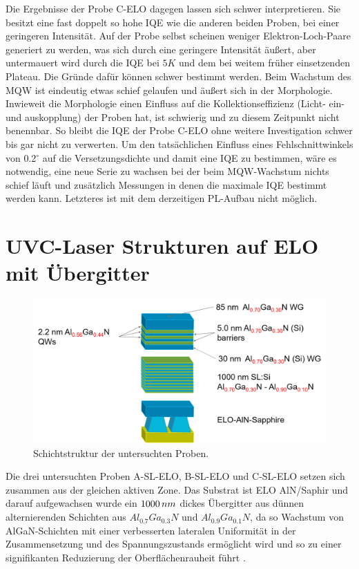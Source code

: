 \newline
Die Ergebnisse der Probe C-ELO dagegen lassen sich schwer interpretieren. Sie besitzt eine fast doppelt so hohe IQE wie die anderen beiden Proben, bei einer geringeren Intensität. Auf der Probe selbst scheinen weniger Elektron-Loch-Paare generiert zu werden, was sich durch eine geringere Intensität äußert, aber untermauert wird durch die IQE bei $5K$ und dem bei weitem früher einsetzenden Plateau. Die Gründe dafür können schwer bestimmt werden. Beim Wachstum des MQW ist eindeutig etwas schief gelaufen und äußert sich in der Morphologie. Inwieweit die Morphologie einen Einfluss auf die Kollektionseffizienz (Licht- ein- und auskopplung) der Proben hat, ist schwierig und zu diesem Zeitpunkt nicht benennbar.
\newline
So bleibt die IQE der Probe C-ELO ohne weitere Investigation schwer bis gar nicht zu verwerten. Um den tatsächlichen Einfluss eines Fehlschnittwinkels von 0.2$^\circ$ auf die Versetzungsdichte und damit eine IQE zu bestimmen, wäre es notwendig, eine neue Serie zu wachsen bei der beim MQW-Wachstum nichts schief läuft und zusätzlich Messungen in denen die maximale IQE bestimmt werden kann. Letzteres ist mit dem derzeitigen PL-Aufbau nicht möglich.



\section{UVC-Laser Strukturen auf ELO mit Übergitter}


\begin{figure}[H]
\includegraphics[width=\linewidth]{Bilder/TS4048/ts4048.png}
\caption{Schichtstruktur der untersuchten Proben.}
\label{fig:schichtenelo}
\end{figure}
\noindent 
Die drei untersuchten Proben A-SL-ELO, B-SL-ELO und C-SL-ELO setzen sich zusammen aus der gleichen aktiven Zone. Das Substrat ist ELO AlN/Saphir und darauf aufgewachsen wurde ein $1000 \thinspace nm$ dickes Übergitter aus dünnen alternierenden Schichten aus $ Al_{0.7}Ga_{0.3}N$ und $ Al_{0.9}Ga_{0.1}N$, da so Wachstum von AlGaN-Schichten mit einer verbesserten lateralen Uniformität in der Zusammensetzung und des Spannungszustands ermöglicht wird und so zu einer signifikanten Reduzierung der Oberflächenrauheit führt \cite{doi:10.1002/pssa.201800005} \cite{tino}.

